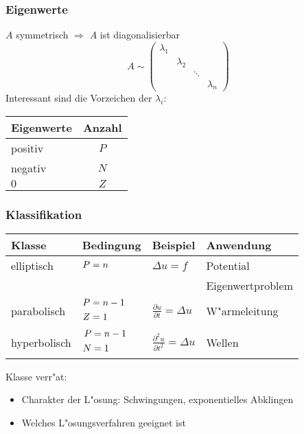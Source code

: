 \documentclass{beamer}
\begin{document}
\begin{frame}
\frametitle{Eigenwerte}
$A$ symmetrisch $\Rightarrow$ $A$ ist diagonalisierbar
\[
A\sim
\begin{pmatrix}
\lambda_1&         &      &         \\
         &\lambda_2&      &         \\
         &         &\ddots&         \\
         &         &      &\lambda_n
\end{pmatrix}
\]
Interessant sind die Vorzeichen der $\lambda_i$:
\begin{center}
\begin{tabular}{lc}\\
Eigenwerte&Anzahl\\
\hline
positiv&$P$\\
negativ&$N$\\
$0$    &$Z$\\
\hline
\end{tabular}
\end{center}
\end{frame}

\begin{frame}
\frametitle{Klassifikation}

\begin{center}
\begin{tabular}{llll}
Klasse&Bedingung&Beispiel&Anwendung\\
\hline
elliptisch &$\begin{aligned}P&=n\mathstrut\end{aligned}$
	&$\displaystyle \Delta u=f                                $
		&Potential\\
&	&	&Eigenwertproblem\\
\hline
parabolisch&%
$\begin{aligned}P&=n-1\mathstrut\\Z&=1\mathstrut\end{aligned}$
	&$\displaystyle \frac{\partial u}{\partial t}=\Delta u    $
		&W"armeleitung\\
\hline
hyperbolisch&%
$\begin{aligned}P&=n-1\mathstrut\\N&=1\mathstrut\end{aligned}$
	&$\displaystyle \frac{\partial^2 u}{\partial t^2}=\Delta u$
		&Wellen\\
\hline
\end{tabular}
\end{center}

Klasse verr"at:
\begin{itemize}
\item Charakter der L"osung: Schwingungen, exponentielles Abklingen
\item Welches L"osungsverfahren geeignet ist
\end{itemize}

\end{frame}
\end{document}
